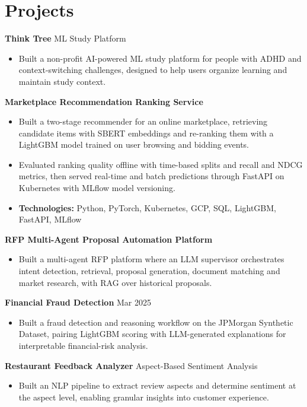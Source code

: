 \documentclass[10pt,a4paper]{article}
\begin{document}
\section{Projects}
\textbf{Think Tree} \textbar{} ML Study Platform\par
\begin{itemize}
  \item Built a non-profit AI-powered ML study platform for people with ADHD and context-switching challenges, designed to help users organize learning and maintain study context.
\end{itemize}
\textbf{Marketplace Recommendation Ranking Service}\par
\begin{itemize}
  \item Built a two-stage recommender for an online marketplace, retrieving candidate items with SBERT embeddings and re-ranking them with a LightGBM model trained on user browsing and bidding events.
  \item Evaluated ranking quality offline with time-based splits and recall and NDCG metrics, then served real-time and batch predictions through FastAPI on Kubernetes with MLflow model versioning.
  \item \textbf{Technologies:} Python, PyTorch, Kubernetes, GCP, SQL, LightGBM, FastAPI, MLflow
\end{itemize}
\textbf{RFP Multi-Agent Proposal Automation Platform}\par
\begin{itemize}
  \item Built a multi-agent RFP platform where an LLM supervisor orchestrates intent detection, retrieval, proposal generation, document matching and market research, with RAG over historical proposals.
\end{itemize}
\textbf{Financial Fraud Detection} \textbar{} Mar 2025\par
\begin{itemize}
  \item Built a fraud detection and reasoning workflow on the JPMorgan Synthetic Dataset, pairing LightGBM scoring with LLM-generated explanations for interpretable financial-risk analysis.
\end{itemize}
\textbf{Restaurant Feedback Analyzer} \textbar{} Aspect-Based Sentiment Analysis\par
\begin{itemize}
  \item Built an NLP pipeline to extract review aspects and determine sentiment at the aspect level, enabling granular insights into customer experience.
\end{itemize}
\end{document}
